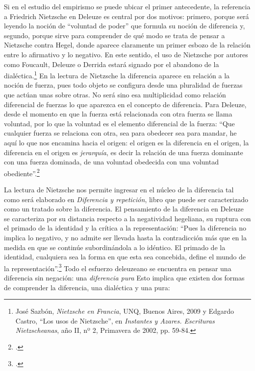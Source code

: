 \documentclass{book}
\begin{document}
Si en el estudio del empirismo se puede ubicar el primer antecedente, la
referencia a Friedrich Nietzsche en Deleuze es central por dos motivos:
primero, porque será leyendo la noción de \enquote{voluntad de poder} que
formula su noción de diferencia y, segundo, porque sirve para comprender
de qué modo se trata de pensar a Nietzsche contra Hegel, donde aparece
claramente un primer esbozo de la relación entre lo afirmativo y lo
negativo. En este sentido, el uso de Nietzsche por autores como
Foucault, Deleuze o Derrida estará signado por el abandono de la
dialéctica.\footnote{José Sazbón, \emph{Nietzsche en Francia}, UNQ,
  Buenos Aires, 2009 y Edgardo Castro, \enquote{Los usos de Nietzsche}, en
  \emph{Instantes y Azares. Escrituras Nietzscheanas}, año II, nº 2,
  Primavera de 2002, pp. 59-84.} En la lectura de Nietzsche la
diferencia aparece en relación a la noción de fuerza, pues todo objeto
se configura desde una pluralidad de fuerzas que actúan unas sobre
otras. No será sino esa multiplicidad como relación diferencial de
fuerzas lo que aparezca en el concepto de diferencia. Para Deleuze,
desde el momento en que la fuerza está relacionada con otra fuerza se
llama voluntad, por lo que la voluntad es el elemento diferencial de la
fuerza: \enquote{Que cualquier fuerza se relaciona con otra, sea para obedecer
sea para mandar, he aquí lo que nos encamina hacia el origen: el origen
es la diferencia en el origen, la diferencia en el origen es
\emph{jerarquía}, es decir la relación de una fuerza dominante con una
fuerza dominada, de una voluntad obedecida con una voluntad
obediente}.\footcites[16]{deleuze1998}[Indudablemente si en la noción de
  voluntad de poder se encuentra la genealogía de la diferencia
  deleuzeana, la repetición surge del eterno retorno: \enquote{(\dots) el
  eterno retorno se dice solamente del devenir, de lo múltiple. Es la
  ley de un mundo sin ser, sin unidad, sin identidad. Lejos de
  \emph{presuponer} lo Uno o lo Mismo, constituye la unidad exclusiva de
  lo múltiple en cuanto múltiple, la única identidad de lo que difiere:
  el volver es el único ``ser'' del devenir.}][163]{deleuze2005a}

La lectura de Nietzsche nos permite ingresar en el núcleo de la
diferencia tal como será elaborado en \emph{Diferencia y repetición},
libro que puede ser caracterizado como un tratado sobre la diferencia.
El pensamiento de la diferencia en Deleuze se caracteriza por su
distancia respecto a la negatividad hegeliana, su ruptura con el primado
de la identidad y la crítica a la representación: \enquote{Pues la diferencia no
implica lo negativo, y no admite ser llevada hasta la contradicción más
que en la medida en que se continúe subordinándola a lo idéntico. El
primado de la identidad, cualquiera sea la forma en que esta sea
concebida, define el mundo de la representación}.\footcite[15]{deleuze2005a} Todo el esfuerzo
deleuzeano se encuentra en pensar una diferencia sin negación: una
\emph{diferencia pura} Esto implica que existen dos formas de
comprender la diferencia, una dialéctica y una pura:
\end{document}
